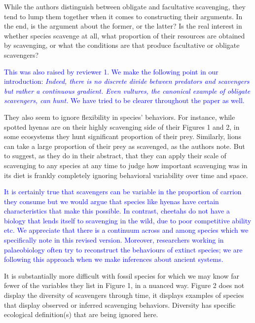 \documentclass[12pt,letterpaper]{article}
\begin{document}
While the authors distinguish between obligate and facultative scavenging, they tend to lump them together when it comes to constructing their arguments.
In the end, is the argument about the former, or the latter? Is the real interest in whether species scavenge at all, what proportion of their resources are obtained by scavenging, or what the conditions are that produce facultative or obligate scavengers? 

\textcolor{blue} {This was also raised by reviewer 1.
We make the following point in our introduction: \textit{Indeed, there is no discrete divide between predators and scavengers but rather a continuous gradient. Even vultures, the canonical example of obligate scavengers, can hunt.} We have tried to be clearer throughout the paper as well. }

They also seem to ignore flexibility in species' behaviors.
For instance, while spotted hyenas are on their highly scavenging side of their Figures 1 and 2, in some ecosystems they hunt significant proportion of their prey.
Similarly, lions can take a large proportion of their prey as scavenged, as the authors note.
But to suggest, as they do in their abstract, that they can apply their scale of scavenging to any species at any time to judge how important scavenging was in its diet is frankly completely ignoring behavioral variability over time and space. 
\smallskip

\textcolor{blue}{It is certainly true that scavengers can be variable in the proportion of carrion they consume but we would argue that species like hyenas have certain characteristics that make this possible.
In contrast, cheetahs do not have a biology that lends itself to scavenging in the wild, due to poor competitive ability etc.
We appreciate that there is a continuum across and among species which we specifically note in this revised version.
Moreover, researchers working in palaeobiology often try to reconstruct the behaviours of extinct species; we are following this approach when we make inferences about ancient systems.}
\smallskip

It is substantially more difficult with fossil species for which we may know far fewer of the variables they list in Figure 1, in a nuanced way.
Figure 2 does not display the diversity of scavengers through time, it displays examples of species that display observed or inferred scavenging behaviors.
Diversity has specific ecological definition(s) that are being ignored here.

\end{document}
